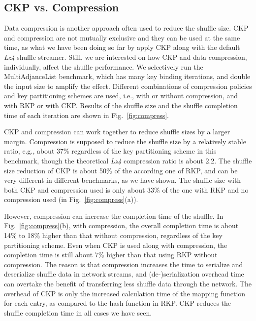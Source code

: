\documentclass[10pt,journal,compsoc]{IEEEtran}
\begin{document}
\subsection{CKP vs. Compression}
Data compression is another approach often used to reduce the shuffle size. 
CKP and compression are not mutually exclusive and they can be used at the 
same time, as what we have been doing so far by apply CKP along with  
the default \emph{Lz4} shuffle streamer. 
Still, we are interested on how CKP and data compression, 
individually, affect the shuffle performance. 
We selectively run the MultiAdjanceList benchmark, which has many key binding iterations, and double the input size to amplify the effect.
Different combinations of compression policies and key partitioning
schemes are used, i.e., with or without compression, and with RKP or with
CKP. Results of the shuffle size and the shuffle completion time of each iteration
are shown in Fig.~\ref{fig:compress}. 

CKP and compression can work together to reduce shuffle sizes by a larger margin. 
Compression is supposed to reduce the shuffle size by a relatively
stable ratio, e.g., about 37\% regardless of the key partitioning scheme 
in this benchmark, though the theoretical \emph{Lz4} 
compression ratio is about 2.2. 
The shuffle size reduction of CKP is about 50\% of the according one of RKP, 
and can be very different in different benchmarks, as we have shown. 
The shuffle size with both CKP and compression used is only about 33\% of 
the one with RKP and no compression used (in Fig.~\ref{fig:compress}(a)). 

However, compression can increase the completion time of the shuffle. 
In Fig.~\ref{fig:compress}(b), with compression, 
the overall completion time is about 14\% to 18\% higher than that 
without compression, regardless of the key partitioning scheme. 
Even when CKP is used along with compression, the completion time is still
about 7\% higher than that using RKP without compression.  
The reason is that compression increases the time to serialize and deserialize
shuffle data in network streams, and (de-)serialization overhead time can
overtake the benefit of transferring less shuffle data through the network.
The overhead of CKP is only the increased calculation time of the mapping function
for each entry, as compared to the hash function in RKP. 
CKP reduces the shuffle completion time in all cases we have seen. 
\end{document}
